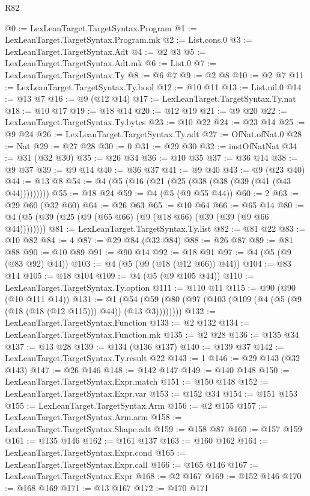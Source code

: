 \begin{lexlean}{R82}
\begin{coremodule}
@0 := LexLeanTarget.TargetSyntax.Program
@1 := LexLeanTarget.TargetSyntax.Program.mk
@2 := List.cons.{0}
@3 := LexLeanTarget.TargetSyntax.Adt
@4 := @2 @3
@5 := LexLeanTarget.TargetSyntax.Adt.mk
@6 := List.{0}
@7 := LexLeanTarget.TargetSyntax.Ty
@8 := @6 @7
@9 := @2 @8
@10 := @2 @7
@11 := LexLeanTarget.TargetSyntax.Ty.bool
@12 := @10 @11
@13 := List.nil.{0}
@14 := @13 @7
@16 := @9 (@12 @14)
@17 := LexLeanTarget.TargetSyntax.Ty.nat
@18 := @10 @17
@19 := @18 @14
@20 := @12 @19
@21 := @9 @20
@22 := LexLeanTarget.TargetSyntax.Ty.bytes
@23 := @10 @22
@24 := @23 @14
@25 := @9 @24
@26 := LexLeanTarget.TargetSyntax.Ty.adt
@27 := OfNat.ofNat.{0}
@28 := Nat
@29 := @27 @28
@30 := 0
@31 := @29 @30
@32 := instOfNatNat
@34 := @31 (@32 @30)
@35 := @26 @34
@36 := @10 @35
@37 := @36 @14
@38 := @9 @37
@39 := @9 @14
@40 := @36 @37
@41 := @9 @40
@43 := @9 (@23 @40)
@44 := @13 @8
@54 := @4 (@5 (@16 (@21 (@25 (@38 (@38 (@39 (@41 (@43 @44)))))))))
@55 := @18 @24
@59 := @4 (@5 (@9 @55 @44))
@60 := 2
@63 := @29 @60 (@32 @60)
@64 := @26 @63
@65 := @10 @64
@66 := @65 @14
@80 := @4 (@5 (@39 (@25 (@9 (@65 @66) (@9 (@18 @66) (@39 (@39 (@9 @66 @44))))))))
@81 := LexLeanTarget.TargetSyntax.Ty.list
@82 := @81 @22
@83 := @10 @82
@84 := 4
@87 := @29 @84 (@32 @84)
@88 := @26 @87
@89 := @81 @88
@90 := @10 @89
@91 := @90 @14
@92 := @18 @91
@97 := @4 (@5 (@9 (@83 @92) @44))
@103 := @4 (@5 (@9 (@18 (@12 @66)) @44))
@104 := @83 @14
@105 := @18 @104
@109 := @4 (@5 (@9 @105 @44))
@110 := LexLeanTarget.TargetSyntax.Ty.option
@111 := @110 @11
@115 := @90 (@90 (@10 @111 @14))
@131 := @1 (@54 (@59 (@80 (@97 (@103 (@109 (@4 (@5 (@9 (@18 (@18 (@12 @115))) @44)) (@13 @3))))))))
@132 := LexLeanTarget.TargetSyntax.Function
@133 := @2 @132
@134 := LexLeanTarget.TargetSyntax.Function.mk
@135 := @2 @28
@136 := @135 @34
@137 := @13 @28
@139 := @134 (@136 @137)
@140 := @139 @37
@142 := LexLeanTarget.TargetSyntax.Ty.result @22
@143 := 1
@146 := @29 @143 (@32 @143)
@147 := @26 @146
@148 := @142 @147
@149 := @140 @148
@150 := LexLeanTarget.TargetSyntax.Expr.match
@151 := @150 @148
@152 := LexLeanTarget.TargetSyntax.Expr.var
@153 := @152 @34
@154 := @151 @153
@155 := LexLeanTarget.TargetSyntax.Arm
@156 := @2 @155
@157 := LexLeanTarget.TargetSyntax.Arm.arm
@158 := LexLeanTarget.TargetSyntax.Shape.adt
@159 := @158 @87
@160 := @157 @159
@161 := @135 @146
@162 := @161 @137
@163 := @160 @162
@164 := LexLeanTarget.TargetSyntax.Expr.cond
@165 := LexLeanTarget.TargetSyntax.Expr.call
@166 := @165 @146
@167 := LexLeanTarget.TargetSyntax.Expr
@168 := @2 @167
@169 := @152 @146
@170 := @168 @169
@171 := @13 @167
@172 := @170 @171

\end{coremodule}
\end{lexlean}
